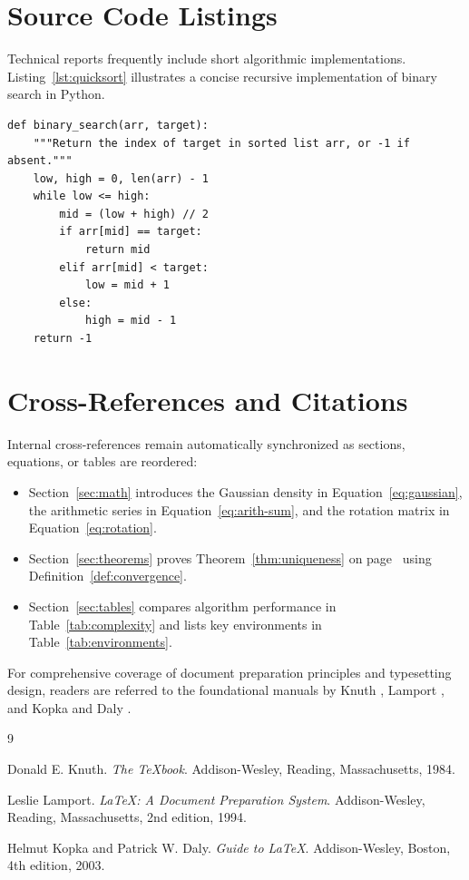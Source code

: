 \documentclass[11pt, a4paper]{article}
\theoremstyle{plain}
\theoremstyle{definition}
\theoremstyle{remark}
\begin{document}
\section{Source Code Listings}
\label{sec:code}

Technical reports frequently include short algorithmic implementations. Listing~\ref{lst:quicksort} illustrates a concise recursive implementation of binary search in Python.

\begin{lstlisting}[caption={Iterative binary search returning the index of a target value or $-1$.}, label={lst:quicksort}]
def binary_search(arr, target):
    """Return the index of target in sorted list arr, or -1 if absent."""
    low, high = 0, len(arr) - 1
    while low <= high:
        mid = (low + high) // 2
        if arr[mid] == target:
            return mid
        elif arr[mid] < target:
            low = mid + 1
        else:
            high = mid - 1
    return -1
\end{lstlisting}

\section{Cross-References and Citations}
\label{sec:references}

Internal cross-references remain automatically synchronized as sections, equations, or tables are reordered:
\begin{itemize}
  \item Section~\ref{sec:math} introduces the Gaussian density in Equation~\eqref{eq:gaussian}, the arithmetic series in Equation~\eqref{eq:arith-sum}, and the rotation matrix in Equation~\eqref{eq:rotation}.
  \item Section~\ref{sec:theorems} proves Theorem~\ref{thm:uniqueness} on page~\pageref{thm:uniqueness} using Definition~\ref{def:convergence}.
  \item Section~\ref{sec:tables} compares algorithm performance in Table~\ref{tab:complexity} and lists key environments in Table~\ref{tab:environments}.
\end{itemize}

For comprehensive coverage of document preparation principles and typesetting design, readers are referred to the foundational manuals by Knuth \cite{knuth1984}, Lamport \cite{lamport1994}, and Kopka and Daly \cite{kopka2003}.

\begin{thebibliography}{9}

Donald E. Knuth.
\textit{The \TeX book}.
Addison-Wesley, Reading, Massachusetts, 1984.

Leslie Lamport.
\textit{\LaTeX: A Document Preparation System}.
Addison-Wesley, Reading, Massachusetts, 2nd edition, 1994.

Helmut Kopka and Patrick W. Daly.
\textit{Guide to \LaTeX}.
Addison-Wesley, Boston, 4th edition, 2003.

\end{thebibliography}
\end{document}
